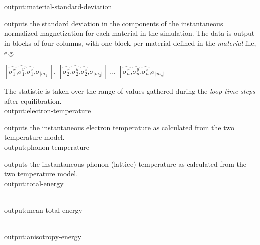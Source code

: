 {\zicf output:material-standard-deviation} outputs
the standard deviation in the components of the instantaneous normalized magnetization for each material in the simulation.
The data is output in blocks of four columns, with one block per material defined in
the \textit{material} file, e.g.

\begin{center}
$\left[ \hat{\sigma_1^x} \textrm{,} \hat{\sigma_1^y} \textrm{,} \hat{\sigma_1^z} \textrm{,} \sigma_{|m_1|} \right]$,
$\left[ \hat{\sigma_2^x} \textrm{,} \hat{\sigma_2^y} \textrm{,} \hat{\sigma_2^z} \textrm{,} \sigma_{|m_2|} \right]$ ...
$\left[ \hat{\sigma_n^x} \textrm{,} \hat{\sigma_n^y} \textrm{,} \hat{\sigma_n^z} \textrm{,} \sigma_{|m_n|} \right]$
\end{center}

The statistic is taken over the range of values gathered during the \textit{loop-time-steps} after equilibration.\\

{\zicf output:electron-temperature} outputs the instantaneous electron temperature as calculated from the two temperature model.\\

{\zicf output:phonon-temperature} outputs the instantaneous phonon (lattice) temperature as calculated from the two temperature model.\\




{\zicf output:total-energy}\\

{\zicf output:mean-total-energy}\\

{\zicf output:anisotropy-energy}\\

